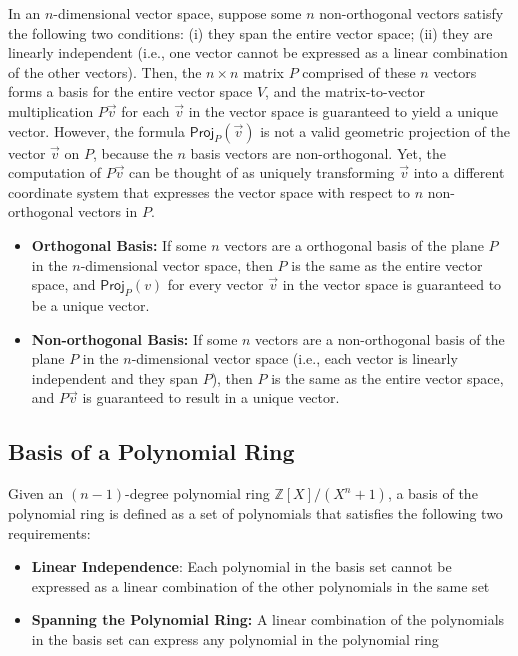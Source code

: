  In an $n$-dimensional vector space, suppose some $n$ non-orthogonal vectors satisfy the following two conditions: (i) they span the entire vector space; (ii) they are linearly independent (i.e., one vector cannot be expressed as a linear combination of the other vectors). Then, the $n \times n$ matrix $P$ comprised of these $n$ vectors forms a basis for the entire vector space $V$, and the matrix-to-vector multiplication $P\vec{v}$ for each $\vec{v}$ in the vector space is guaranteed to yield a unique vector. However, the formula $\textsf{Proj}_P(\vec{v})$ is not a valid geometric projection of the vector $\vec{v}$ on $P$, because the $n$ basis vectors are non-orthogonal. Yet, the computation of $P\vec{v}$ can be thought of as uniquely transforming $\vec{v}$ into a different coordinate system that expresses the vector space with respect to $n$ non-orthogonal vectors in $P$. 

\begin{tcolorbox}[title={\textbf{\tboxtheorem{\ref*{subsec:projection}} Uniqueness of Transformed Vectors}}]

\begin{itemize}
\item  \textbf{Orthogonal Basis:} If some $n$ vectors are a orthogonal basis of the plane $P$ in the $n$-dimensional vector space, then $P$ is the same as the entire vector space, and $\textsf{Proj}_P(v)$ for every vector $\vec{v}$ in the vector space is guaranteed to be a unique vector.
\item \textbf{Non-orthogonal Basis:} If some $n$ vectors are a non-orthogonal basis of the plane $P$ in the $n$-dimensional vector space (i.e., each vector is linearly independent and they span $P$), then $P$ is the same as the entire vector space, and $P\vec{v}$ is guaranteed to result in a unique vector.  
\end{itemize}
\end{tcolorbox}




\subsection{Basis of a Polynomial Ring}
\label{subsec:polynomial-ring-basis}

Given an $(n-1)$-degree polynomial ring $\mathbb{Z}[X] / (X^n + 1)$, a basis of the polynomial ring is defined as a set of polynomials that satisfies the following two requirements:

\begin{itemize}

\item \textbf{Linear Independence}: Each polynomial in the basis set cannot be expressed as a linear combination of the other polynomials in the same set
\item \textbf{Spanning the Polynomial Ring:} A linear combination of the polynomials in the basis set can express any polynomial in the polynomial ring
\end{itemize}

